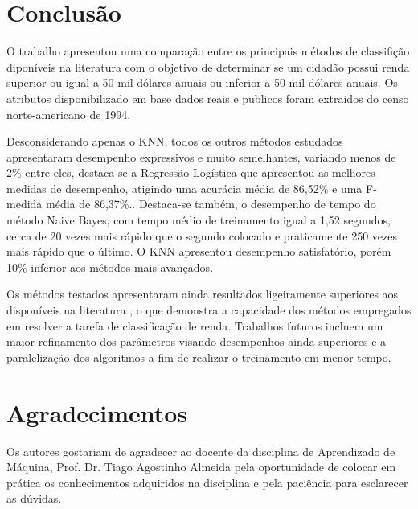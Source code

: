 \section{Conclusão}

O trabalho apresentou uma comparação entre os principais métodos de classifição diponíveis na literatura com o objetivo de determinar se um cidadão possui renda superior ou igual a 50 mil dólares anuais ou inferior a 50 mil dólares anuais. Os atributos disponibilizado em base dados reais e publicos foram extraídos do censo norte-americano de 1994.

Desconsiderando apenas o KNN, todos os outros métodos estudados apresentaram desempenho expressivos e muito semelhantes, variando menos de 2\% entre eles,  destaca-se a Regressão Logística que apresentou as melhores medidas de desempenho, atigindo uma acurácia média de 86,52\% e uma F-medida média de 86,37\%.. Destaca-se também, o desempenho de tempo do método Naive Bayes, com tempo médio de treinamento igual a 1,52 segundos, cerca de 20 vezes mais rápido que o segundo colocado e praticamente 250 vezes mais rápido que o último. O KNN apresentou desempenho satisfatório, porém 10\% inferior aos métodos mais avançados.

Os métodos testados apresentaram ainda resultados ligeiramente superiores aos disponíveis na literatura \cite{base2}, o que demonstra a capacidade dos métodos empregados em resolver a tarefa de classificação de renda. Trabalhos futuros incluem um maior refinamento dos parâmetros visando desempenhos ainda superiores e a paralelização dos algoritmos a fim de realizar o treinamento em menor tempo.

\section*{Agradecimentos}
Os autores gostariam de agradecer ao docente da disciplina de Aprendizado de Máquina, Prof. Dr. Tiago Agostinho Almeida pela oportunidade de colocar em prática os conhecimentos adquiridos na disciplina e pela paciência para esclarecer as dúvidas.